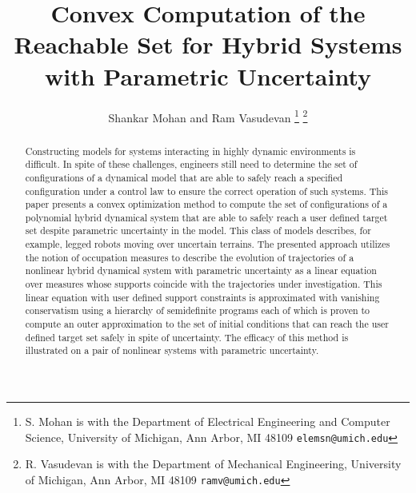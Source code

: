 \documentclass[letterpaper]{ieeeconf}
\title{Convex Computation of the Reachable Set for Hybrid Systems with Parametric Uncertainty}
\author{Shankar Mohan and Ram Vasudevan \vspace*{-0.75cm}
 \thanks{S. Mohan is with the Department of Electrical Engineering and Computer Science, University of Michigan, Ann Arbor, MI 48109
{\scriptsize \texttt{elemsn@umich.edu}}}
 \thanks{R. Vasudevan is with the Department of Mechanical Engineering, University of Michigan, Ann Arbor, MI 48109
{\scriptsize \texttt{ramv@umich.edu}}}%
}
\begin{document}
\maketitle
  \begin{abstract}
	Constructing models for systems interacting in highly dynamic environments is difficult.
	In spite of these challenges, engineers still need to determine the set of configurations of a dynamical model that are able to safely reach a specified configuration under a control law to ensure the correct operation of such systems. 
	This paper presents a convex optimization method to compute the set of configurations of a polynomial hybrid dynamical system that are able to safely reach a user defined target set despite parametric uncertainty in the model.
	This class of models describes, for example, legged robots moving over uncertain terrains. 
	The presented approach utilizes the notion of occupation measures to describe the evolution of trajectories of a nonlinear hybrid dynamical system with parametric uncertainty as a linear equation over measures whose supports coincide with the trajectories under investigation. 
	This linear equation with user defined support constraints is approximated with vanishing conservatism using a hierarchy of semidefinite programs each of which is proven to compute an outer approximation to the set of initial conditions that can reach the user defined target set safely in spite of uncertainty. 
	The efficacy of this method is illustrated on a pair of nonlinear systems with parametric uncertainty.
  \end{abstract}
  
  
  
  
  
  


\end{document}

